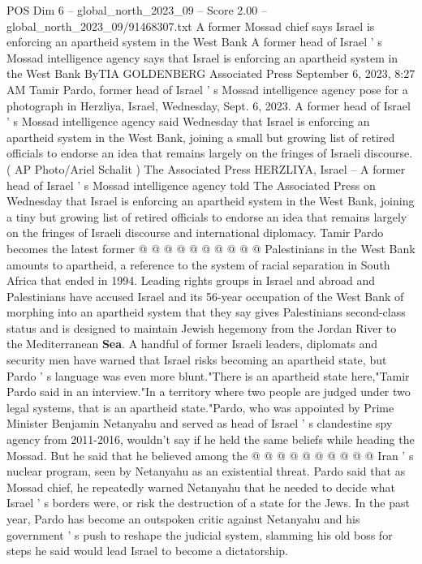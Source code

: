 \begin{textsample}{POS Dim 6 – global\_north\_2023\_09 – Score 2.00 – global\_north\_2023\_09/91468307.txt}  \label{ex:f6_pos_074}
A former Mossad chief says Israel is enforcing an apartheid system in the West Bank A former head of Israel ' s Mossad intelligence agency says that Israel is enforcing an apartheid system in the West Bank ByTIA GOLDENBERG Associated Press September 6, 2023, 8:27 AM Tamir Pardo, former head of Israel ' s Mossad intelligence agency pose for a photograph in Herzliya, Israel, Wednesday, Sept. 6, 2023.
A former head of Israel ' s Mossad intelligence agency said Wednesday that Israel is enforcing an apartheid system in the West Bank, joining a small but growing list of retired officials to endorse an idea that remains largely on the fringes of Israeli discourse. ( AP Photo/Ariel Schalit ) The Associated Press HERZLIYA, Israel -- A former head of Israel ' s Mossad intelligence agency told The Associated Press on Wednesday that Israel is enforcing an apartheid system in the West Bank, joining a tiny but growing list of retired officials to endorse an idea that remains largely on the fringes of Israeli discourse and international diplomacy.
Tamir Pardo becomes the latest former @ @ @ @ @ @ @ @ @ @ Palestinians in the West Bank amounts to apartheid, a reference to the system of racial separation in South Africa that ended in 1994.
Leading rights groups in Israel and abroad and Palestinians have accused Israel and its 56-year occupation of the West Bank of morphing into an apartheid system that they say gives Palestinians second-class status and is designed to maintain Jewish hegemony from the Jordan River to the Mediterranean \textbf{Sea}.
A handful of former Israeli leaders, diplomats and security men have warned that Israel risks becoming an apartheid state, but Pardo ' s language was even more blunt."There is an apartheid state here,"Tamir Pardo said in an interview."In a territory where two people are judged under two legal systems, that is an apartheid state."Pardo, who was appointed by Prime Minister Benjamin Netanyahu and served as head of Israel ' s clandestine spy agency from 2011-2016, wouldn't say if he held the same beliefs while heading the Mossad.
But he said that he believed among the @ @ @ @ @ @ @ @ @ @ Iran ' s nuclear program, seen by Netanyahu as an existential threat.
Pardo said that as Mossad chief, he repeatedly warned Netanyahu that he needed to decide what Israel ' s borders were, or risk the destruction of a state for the Jews.
In the past year, Pardo has become an outspoken critic against Netanyahu and his government ' s push to reshape the judicial system, slamming his old boss for steps he said would lead Israel to become a dictatorship.

\end{textsample}
